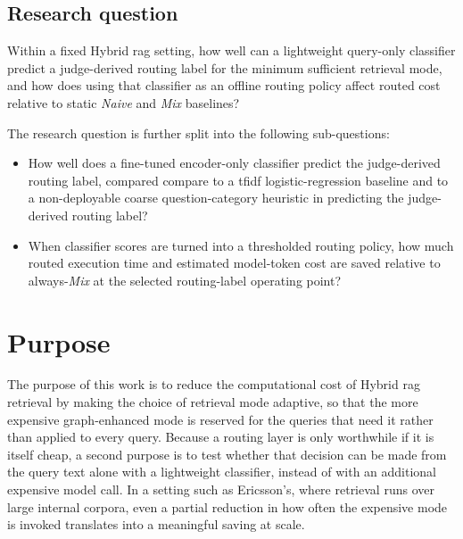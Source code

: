 \documentclass[english, bibtex]{kththesis}               %
\numberwithin{listing}{chapter}
\providecommand{\DIFaddtex}[1]{{\protect\color{blue} \sf #1}} %
\providecommand{\DIFdeltex}[1]{{\protect\color{red} \scriptsize #1}} %
\providecommand{\DIFaddbegin}{} %
\providecommand{\DIFaddend}{} %
\providecommand{\DIFdelbegin}{} %
\providecommand{\DIFdelend}{} %
\providecommand{\DIFadd}[1]{\texorpdfstring{\DIFaddtex{#1}}{#1}} %
\providecommand{\DIFdel}[1]{\texorpdfstring{\DIFdeltex{#1}}{}} %
\begin{document}
\subsection{Research question}
\label{sec:researchQuestion}

Within a fixed Hybrid \gls{rag} setting, how well can a lightweight query-only classifier predict a judge-derived routing label for the minimum sufficient retrieval mode, and how does using that classifier as an offline routing policy affect routed cost relative to static \emph{Naive} and \emph{Mix} baselines?

The research question is further split into the following sub-questions:

\begin{itemize}
    \item How \DIFdelbegin \DIFdel{well }\DIFdelend does a fine-tuned encoder-only classifier \DIFdelbegin \DIFdel{predict the judge-derived routing label, compared }\DIFdelend \DIFaddbegin \DIFadd{compare }\DIFaddend to a \gls{tfidf} logistic-regression baseline and \DIFaddbegin \DIFadd{to }\DIFaddend a non-deployable coarse question-category heuristic \DIFaddbegin \DIFadd{in predicting the judge-derived routing label}\DIFaddend ?
    \item When classifier scores are turned into a thresholded routing policy, how much routed execution time and estimated model-token cost are saved relative to always-\emph{Mix} at the selected routing-label operating point?
\end{itemize}

\section{Purpose}
\label{sec:purpose}
The purpose of this work is to reduce the computational cost of Hybrid \gls{rag} retrieval by making the choice of retrieval mode adaptive, so that the more expensive graph-enhanced mode is reserved for the queries that need it rather than applied to every query. Because a routing layer is only worthwhile if it is itself cheap, a second purpose is to test whether that decision can be made from the query text alone with a lightweight classifier, instead of with an additional expensive model call. In a setting such as Ericsson's, where retrieval runs over large internal corpora, even a partial reduction in how often the expensive mode is invoked translates into a meaningful saving at scale.
\end{document}
